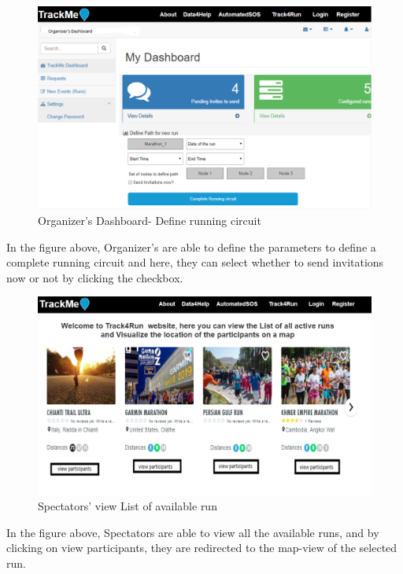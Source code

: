 \documentclass[a4paper, hidelinks, 12pt]{report}
\begin{document}
	 \begin{figure}[H]
		\centering
		\includegraphics[scale=0.35]{../Assets/organizer_dashboard_2.png}\caption[UI: Organizer's Dashboard - Define running circuit]{Organizer's Dashboard- Define running circuit}
		\label{fig:Make_Request}
	\end{figure}
	
	In the figure above, Organizer's are able to define the parameters to define a complete running circuit and here, they can select whether to send invitations now or not by clicking the checkbox.
	
	\begin{figure}[H]
		\centering
		\includegraphics[scale=0.35]{../Assets/t4r_list_of_available_run.png}\caption[UI: Spectators' view List of available run]{Spectators' view List of available run}
		\label{fig:Make_Request}
	\end{figure}
	
	In the figure above, Spectators are able to view all the available runs, and by clicking on view participants, they are redirected to the map-view of the selected run. 
	
\end{document}
